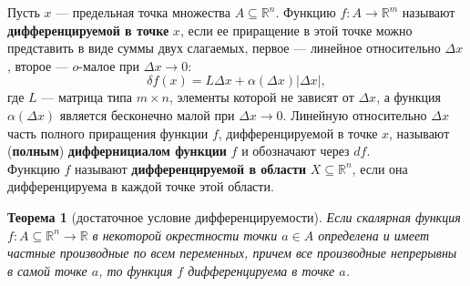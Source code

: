 \documentclass[12pt]{report}
\numberwithin{equation}{section}
\newtheorem{theorem}{Теорема}[section]
\begin{document}
Пусть $x$ --- предельная точка множества $A \subseteq \mathbb{R}^n$. Функцию $f: A \to \mathbb{R}^m$ называют \textbf{дифференцируемой в точке} $x$, если ее приращение в этой точке можно представить в виде суммы двух слагаемых, первое --- линейное относительно $\Delta x$, второе --- $o$-малое при $\Delta x \to 0$:
\begin{equation} \label{eq:37:2}
\delta f(x) = L \Delta x + \alpha(\Delta x)|\Delta x|,
\end{equation}
где $L$ --- матрица типа $m \times n$, элементы которой не зависят от $\Delta x$, а функция $\alpha(\Delta x)$ является бесконечно малой при $\Delta x \to 0$. Линейную относительно $\Delta x$ часть полного приращения функции $f$, дифференцируемой в точке $x$, называют (\textbf{полным}) \textbf{диффернициалом функции} $f$ и обозначают через $df$.\\

Функцию $f$ называют \textbf{дифференцируемой в области} $X \subseteq \mathbb{R}^n$, если она дифференцируема в каждой точке этой области.\\

\begin{theorem}[достаточное условие дифференцируемости] \label{th:37:1}
Если скалярная функция $f : A \subseteq \mathbb{R}^n \to \mathbb{R}$ в некоторой окрестности точки $a \in A$ определена и имеет частные производные по всем переменных, причем все производные непрерывны в самой точке $a$, то функция $f$ дифференцируема в точке $a$.
\end{theorem}
\end{document}
